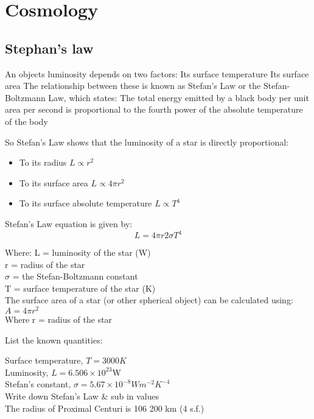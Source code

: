 \chapter{Cosmology}

\section{Stephan's law}
An objects luminosity depends on two factors:
Its surface temperature
Its surface area
The relationship between these is known as Stefan's Law or the Stefan-Boltzmann Law, which states:
The total energy emitted by a black body per unit area per second is proportional to the fourth power of the absolute temperature of the body

So Stefan's Law shows that the luminosity of a star is directly proportional:
\begin{itemize}
    \item To its radius $L \propto r^2$
    \item To its surface area $L \propto 4 \pi r^2$
    \item To its surface absolute temperature $L \propto T^4$
\end{itemize}


Stefan's Law equation is given by:
\begin{equation*}
    L = 4 \pi r2\sigma T^{4}
\end{equation*}

Where:
L = luminosity of the star (W)\\
r = radius of the star\\
$\sigma$ = the Stefan-Boltzmann constant\\
T = surface temperature of the star (K)\\
The surface area of a star (or other spherical object) can be calculated using: $A = 4\pi r^2$\\
Where r = radius of the star

\begin{soln}
List the known quantities: 

Surface temperature, $T = 3000 K$\\
Luminosity, $L = 6.506 \times 10^{23} $W\\
Stefan's constant, $\sigma = 5.67 \times 10^{-8} W m^{-2} K^{-4}$\\
Write down Stefan's Law \& sub in values\\
The radius of Proximal Centuri is 106 200 km (4 s.f.)
\end{soln}
